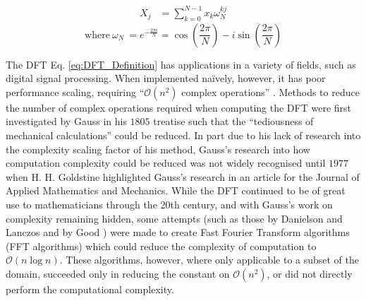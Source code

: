\begin{align}
    X_j &= \sum_{k=0}^{N-1}x_k\omega_N^{kj}\label{eq:DFT_Definition}
\end{align}
\begin{equation}
    \text{where}~\omega_N~=e^{-\frac{2\pi i}{N}}
    = \cos{\left(\frac{2\pi}{N}\right)}-i\sin{\left(\frac{2\pi}{N}\right)}\label{eq:ComplexRootsOfUnity}
\end{equation}

The DFT Eq. \ref{eq:DFT_Definition} has applications in a variety of fields, 
such as digital signal processing\cite{Bellanger2024}.
When implemented naïvely, however, it has poor performance scaling, requiring  
``$\mathcal{O}\left(n^2\right)$ complex operations'' \cite{VanLoan1992}.
Methods to reduce the number of complex operations required when computing the DFT were first investigated by Gauss in his $1805$ treatise such that the ``tediousness of mechanical calculations''\cite{Gauss1866} could be reduced.\cite{Heideman1985}
In part due to his lack of research into the complexity scaling factor of his method, Gauss's research into how computation complexity could be reduced was not widely recognised until $1977$ when H. H. Goldstine highlighted Gauss's research in an article for the Journal of Applied Mathematics and Mechanics.\cite{Heideman1985}\cite{Heinrich1980}
While the DFT continued to be of great use to mathematicians through the 20th century, and with Gauss's work on complexity remaining hidden, some attempts (such as those by Danielson and Lanczos \cite{Danielson1942} and by Good \cite{Good1958}) were made to create Fast Fourier Transform algorithms (FFT algorithms) which could reduce the complexity of computation to $\mathcal{O}\left(n\log n\right)$.
These algorithms, however, where only applicable to a subset of the domain\cite{Good1958}, succeeded only in reducing the constant on $\mathcal{O}\left(n^2\right)$, or did not directly perform the computational complexity\cite{Danielson1942}.


